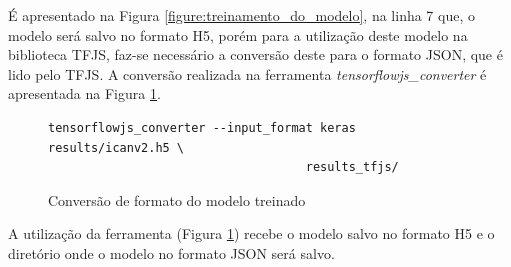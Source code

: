 \par É apresentado na Figura \ref{figure:treinamento_do_modelo}, na linha 7 que, o modelo será salvo no formato H5, porém para a utilização deste modelo na biblioteca TFJS, faz-se necessário a conversão deste para o formato JSON, que é lido pelo TFJS. A conversão realizada na ferramenta \textit{tensorflowjs\_converter} é apresentada na Figura \ref{figure:conversao_do_modelo}.

\begin{figure}[H]
    \centering
    \begin{lstlisting}[language=Shell]
tensorflowjs_converter --input_format keras results/icanv2.h5 \
                                    results_tfjs/
    \end{lstlisting}
    \caption{Conversão de formato do modelo treinado}
    \label{figure:conversao_do_modelo}
\end{figure}

\par A utilização da ferramenta (Figura \ref{figure:conversao_do_modelo}) recebe o modelo salvo no formato H5 e o diretório onde o modelo no formato JSON será salvo.








